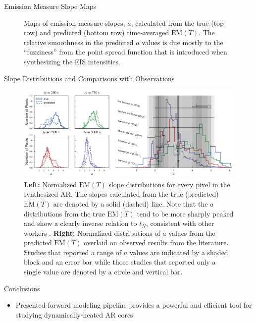 \documentclass[final]{beamer}
\begin{document}
\begin{frame}
\begin{columns}[T]
\begin{column}{0.49\linewidth}
\begin{block}{Emission Measure Slope Maps}
\begin{figure}
        \caption{Maps of emission measure slopes, $a$, calculated from the true (top row) and predicted (bottom row) time-averaged $\mathrm{EM}(T)$. The relative smoothness in the predicted $a$ values is due mostly to the ``fuzziness'' from the point spread function that is introduced when synthesizing the EIS intensities.}
        \label{fig:em_slope_maps}
      \end{figure}
      \vspace{-0.5ex}
    \end{block}
    \begin{block}{Slope Distributions and Comparisons with Observations}
      \begin{figure}
        \includegraphics[width=\columnwidth]{figures/slope_distributions.pdf}
        \caption{\textbf{Left:} Normalized $\mathrm{EM}(T)$ slope distributions for every pixel in the synthesized AR. The slopes calculated from the true (predicted) $\mathrm{EM}(T)$ are denoted by a solid (dashed) line. Note that the $a$ distributions from the true $\mathrm{EM}(T)$ tend to be more sharply peaked and show a clearly inverse relation to $t_N$, consistent with other workers \citep[e.g.][]{cargill_active_2014}. \textbf{Right:} Normalized distributions of $a$ values from the predicted $\mathrm{EM}(T)$ overlaid on observed results from the literature. Studies that reported a range of $a$ values are indicated by a shaded block and an error bar while those studies that reported only a single value are denoted by a circle and vertical bar.}
        \label{fig:slope_dist}
      \end{figure}
      \vspace{-0.5ex}
    \end{block}
    \begin{block}{Conclusions}
      \begin{itemize}
        \item Presented forward modeling pipeline provides a powerful and efficient tool for studying dynamically-heated AR cores

\end{itemize}
\end{block}
\end{column}
\end{columns}
\end{frame}
\end{document}
